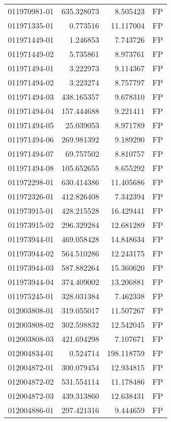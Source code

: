 \begin{tabular}{lrrl}
011970981-01 &  635.328073 &     8.505423 &   FP \\
011971335-01 &    0.773516 &    11.117004 &   FP \\
011971449-01 &    1.246853 &     7.743726 &   FP \\
011971449-02 &    5.735861 &     8.973761 &   FP \\
011971494-01 &    3.222973 &     9.114367 &   FP \\
011971494-02 &    3.223274 &     8.757797 &   FP \\
011971494-03 &  438.165357 &     9.678310 &   FP \\
011971494-04 &  157.444688 &     9.221411 &   FP \\
011971494-05 &   25.039053 &     8.971789 &   FP \\
011971494-06 &  269.981392 &     9.189290 &   FP \\
011971494-07 &   69.757502 &     8.810757 &   FP \\
011971494-08 &  105.652655 &     8.655292 &   FP \\
011972298-01 &  630.414386 &    11.405686 &   FP \\
011972326-01 &  412.826408 &     7.342394 &   FP \\
011973915-01 &  428.215528 &    16.429441 &   FP \\
011973915-02 &  296.329284 &    12.681289 &   FP \\
011973944-01 &  469.058428 &    14.848634 &   FP \\
011973944-02 &  564.510286 &    12.243175 &   FP \\
011973944-03 &  587.882264 &    15.360620 &   FP \\
011973944-04 &  374.409002 &    13.206881 &   FP \\
011975245-01 &  328.031384 &     7.462338 &   FP \\
012003808-01 &  319.055017 &    11.507267 &   FP \\
012003808-02 &  302.598832 &    12.542045 &   FP \\
012003808-03 &  421.694298 &     7.107671 &   FP \\
012004834-01 &    0.524714 &   198.118759 &   FP \\
012004872-01 &  300.079454 &    12.934815 &   FP \\
012004872-02 &  531.554114 &    11.178486 &   FP \\
012004872-03 &  439.313860 &    12.638431 &   FP \\
012004886-01 &  297.421316 &     9.444659 &   FP \\

\end{tabular}
